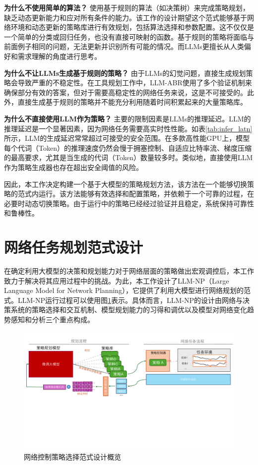 \textbf{为什么不使用简单的算法？} 使用基于规则的算法（如决策树）来完成策略规划，缺乏动态更新能力和应对所有条件的能力。该工作的设计期望这个范式能够基于网络环境和动态更新的策略库进行有效规划，包括算法选择和参数配置。这不仅仅是一个简单的分类或回归任务，也没有直接可映射的函数。基于规则的策略将面临与前面例子相同的问题，无法更新并识别所有可能的情况。而LLMs更擅长从人类偏好和需求理解的角度进行思考。

\textbf{为什么不让LLMs生成基于规则的策略？} 由于LLMs的幻觉问题，直接生成规划策略会导致严重的不稳定性。在工具规划工作中，LLM-ABR使用了多个验证机制来确保部分有效的答案，但对于需要高稳定性的网络任务来说，这是不可接受的。此外，直接生成基于规则的策略并不能充分利用随着时间积累起来的大量策略库。

\textbf{为什么不直接使用LLM作为策略？} 主要的限制因素是LLMs的推理延迟。LLM的推理延迟是一个显著因素，因为网络任务需要高实时性性能。如表\ref{tab:infer_latn}所示，LLM的生成延迟常常超过可接受的安全范围。在多款高性能GPU上，模型每个代词（Token）的推理速度仍然会慢于拥塞控制、自适应比特率流、梯度压缩的最高要求，尤其是当生成的代词（Token）数量较多时。类似地，直接使用LLM作为策略生成器也存在超出安全阈值的风险。



因此，本工作决定构建一个基于大模型的策略规划方法，该方法在一个能够切换策略的范式内运行。该方法能够有效选择和配置策略，并依赖于一个可靠的过程，在必要时动态切换策略。由于运行中的策略已经经过验证并且稳定，系统保持可靠性和鲁棒性。




\section{网络任务规划范式设计}
在确定利用大模型的决策和规划能力对于网络层面的策略做出宏观调控后，本工作致力于解决将其应用过程中的挑战。为此，本工作设计了LLM-NP（Large Language Model for Network Planning），它提供了利用大模型进行网络规划的范式。LLM-NP运行过程可以使用图\ref{fig_llmcc_design}表示。具体而言，LLM-NP的设计由网络与决策系统的策略选择和交互机制、模型规划能力的习得和调优以及模型对网络变化趋势感知和分析三个重点构成。

\begin{figure} [ht]
\centering
\includegraphics[width=\textwidth]{figures/chap04/design.pdf} 
\caption{网络控制策略选择范式设计概览}
\label{fig_llmcc_design}
\end{figure}


